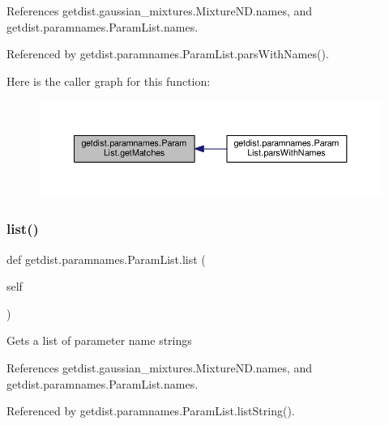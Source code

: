 References getdist.\+gaussian\+\_\+mixtures.\+Mixture\+N\+D.\+names, and getdist.\+paramnames.\+Param\+List.\+names.



Referenced by getdist.\+paramnames.\+Param\+List.\+pars\+With\+Names().

Here is the caller graph for this function\+:
\nopagebreak
\begin{figure}[H]
\begin{center}
\leavevmode
\includegraphics[width=350pt]{classgetdist_1_1paramnames_1_1ParamList_acd3847e84096601009f5ccb145392457_icgraph}
\end{center}
\end{figure}
\mbox{\label{classgetdist_1_1paramnames_1_1ParamList_ab27dfd8987f2ed7d1de27750b6eef094}} 
\subsubsection{\texorpdfstring{list()}{list()}}
{\footnotesize\ttfamily def getdist.\+paramnames.\+Param\+List.\+list (\begin{DoxyParamCaption}\item[{}]{self }\end{DoxyParamCaption})}

\begin{DoxyVerb}Gets a list of parameter name strings
\end{DoxyVerb}
 

References getdist.\+gaussian\+\_\+mixtures.\+Mixture\+N\+D.\+names, and getdist.\+paramnames.\+Param\+List.\+names.



Referenced by getdist.\+paramnames.\+Param\+List.\+list\+String().

